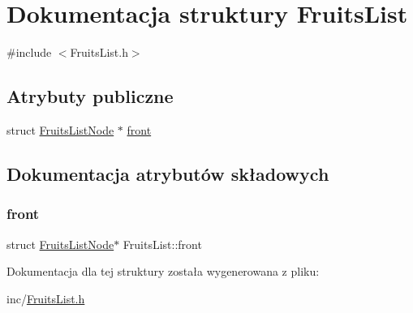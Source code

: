 \hypertarget{struct_fruits_list}{}\section{Dokumentacja struktury Fruits\+List}
\label{struct_fruits_list}


{\ttfamily \#include $<$Fruits\+List.\+h$>$}

\subsection*{Atrybuty publiczne}
\begin{DoxyCompactItemize}
\item 
struct \mbox{\hyperlink{struct_fruits_list_node}{Fruits\+List\+Node}} $\ast$ \mbox{\hyperlink{struct_fruits_list_a5c2fca241db76fc1dca6435f4263a910}{front}}
\end{DoxyCompactItemize}


\subsection{Dokumentacja atrybutów składowych}
\mbox{\label{struct_fruits_list_a5c2fca241db76fc1dca6435f4263a910}} 
\subsubsection{\texorpdfstring{front}{front}}
{\footnotesize\ttfamily struct \mbox{\hyperlink{struct_fruits_list_node}{Fruits\+List\+Node}}$\ast$ Fruits\+List\+::front}



Dokumentacja dla tej struktury została wygenerowana z pliku\+:\begin{DoxyCompactItemize}
\item 
inc/\mbox{\hyperlink{_fruits_list_8h}{Fruits\+List.\+h}}\end{DoxyCompactItemize}
